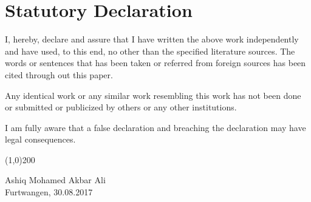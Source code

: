 \chapter*{Statutory Declaration}

I, hereby, declare and assure that I have written the above work independently and have used, to this end, no other than the specified literature sources. The words or sentences that has been taken or referred from foreign sources has been cited through out this paper.
\vspace*{.5cm} \par
\noindent
Any identical work or any similar work resembling this work has not been done or submitted or publicized by others or any other institutions.
\vspace*{.5cm} \par
\noindent
I am fully aware that a false declaration and breaching the declaration may have legal consequences.

\vspace*{1.5cm} \par
\noindent
\line(1,0){200} \par
\noindent
Ashiq Mohamed Akbar Ali\\
Furtwangen, 30.08.2017